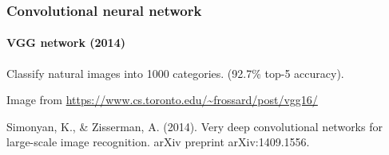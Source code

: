\documentclass[9pt]{beamer}
\begin{document}

\begin{frame}

  \frametitle{Convolutional neural network}

  \framesubtitle{VGG network (2014)}

  \begin{center}
  \end{center}

  Classify natural images into 1000 categories. (92.7\% top-5
  accuracy).

  \medskip

  {\footnotesize Image from
    \url{https://www.cs.toronto.edu/~frossard/post/vgg16/}}

  \smallskip

  {\footnotesize Simonyan, K., \& Zisserman, A. (2014). Very deep
    convolutional networks for large-scale image recognition. arXiv
    preprint arXiv:1409.1556.}
\end{frame}




\end{document}
